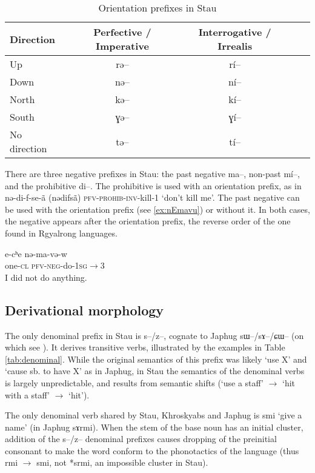 \documentclass[oneside,a4paper,11pt]{article}
\newcommand{\ipa}[1]{{\phon #1}} %
\begin{document}
\begin{table}[h]
\caption{Orientation prefixes in Stau} 
\label{tab:dir.pref} \centering
\begin{tabular}{lcccc}
\toprule
Direction & Perfective / Imperative & Interrogative / Irrealis \\
\midrule
 Up & \ipa{rə--} & \ipa{rí--} \\
Down & \ipa{nə--} & \ipa{ní--} \\
North  & \ipa{kə--} & \ipa{kí--} \\
South & \ipa{ɣə--} & \ipa{ɣí--} \\
No direction & \ipa{tə--} & \ipa{tí--} \\
\bottomrule
\end{tabular}
\end{table}

There are three negative prefixes in Stau: the past negative \ipa{ma--}, non-past \ipa{mí--}, and the prohibitive \ipa{di--}. The prohibitive is used with an orientation prefix, as in \ipa{nə-di-f-se-ã}  (\ipa{nədifsã}) \textsc{pfv-prohib-inv}-kill-1 `don't kill me'. The past negative can be used with the orientation prefix (see \ref{ex:nEmavu}) or without it. In both cases, the negative appears after the orientation prefix, the reverse order of the one found in Rgyalrong languages.


\begin{exe}
\ex \label{ex:nEmavu} 
\gll
\ipa{e-cʰe} 	\ipa{nə-ma-və-w}  \\
one-\textsc{cl} \textsc{pfv-neg}-do-\textsc{1sg}$\rightarrow$3 \\
\glt I did not do anything.
\end{exe}


 \subsection{Derivational morphology}
 
The only denominal prefix in Stau is \ipa{s--/z--}, cognate to Japhug \ipa{sɯ--/sɤ--/ɕɯ--} (on which see \citealt[14-17]{jacques14antipassive}). It derives transitive verbs, illustrated by the examples in Table \ref{tab:denominal}. While the original semantics of this prefix was likely `use X' and `cause sb. to have X' as in Japhug, in Stau the semantics of the denominal verbs is largely unpredictable, and results from semantic shifts (`use a staff' $\rightarrow$ `hit with a staff' $\rightarrow$  `hit'). 

The only denominal verb shared by Stau, Khroskyabs and Japhug is \ipa{smi} `give a name' (in Japhug \ipa{sɤrmi}). When the stem of the base noun has an initial cluster, addition of the \ipa{s--/z--} denominal prefixes causes dropping of the preinitial consonant to make the word conform to the phonotactics of the language (thus \ipa{rmi} $\rightarrow$ \ipa{smi}, not *\ipa{srmi}, an impossible cluster in Stau). 
\end{document}
